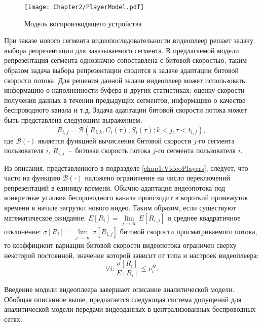 \begin{figure}[htbp]
\begin{center}
\texttt{[image: Chapter2/PlayerModel.pdf]}
\caption{Модель воспроизводящего устройства}
\label{fig:PlayerModel}
\end{center}
\end{figure}

При заказе нового сегмента видеопоследовательности видеоплеер решает задачу выбора репрезентации для заказываемого сегмента. В предлагаемой модели репрезентация сегмента однозначно сопоставлена с битовой скоростью, таким образом задача выбора репрезентации сводится к задаче адаптации битовой скорости потока. Для решения данной задачи видеоплеер может использовать информацию о наполненности буфера и других статистиках: оценку скорости получения данных в течении предыдущих сегментов, информацию о качестве беспроводного канала и т.д. Задача адаптации битовой скорости потока может быть представлена следующим выражением:
\begin{equation}
\nonumber
R_{i,j} = \mathcal{B}\left(R_{i,k}, C_i(\tau), S_i(\tau); k < j, \tau<t_{i,j} \right),
\end{equation}
где $\mathcal{B}\left(\cdot\right)$ является функцией вычисления битовой скорости $j$-го сегмента пользователя $i$, $R_{i,j}$~--~битовая скорость потока $j$-го сегмента пользователя $i$.

Из описания, представленного в подразделе \ref{chap1:VideoPlayers}, следует, что часто на функцию $\mathcal{B}\left(\cdot\right)$ наложено ограничение на число переключений репрезентаций в единицу времени. Обычно адаптация видеопотока под конкретные условия беспроводного канала происходит в короткий промежуток времени в начале загрузки нового видео. Таким образом, если существуют математическое ожидание: $E[R_i] = \lim\limits_{j \rightarrow \infty}E[R_{i,j}]$ и среднее квадратичное отклонение: $\sigma\left[R_{i}\right] = \lim\limits_{j \rightarrow \infty}\sigma\left[R_{i,j}\right] $ битовой скорости просматриваемого потока, то коэффициент вариации битовой скорости видеопотока ограничен сверху некоторой постоянной, значение которой зависит от типа и настроек видеоплеера:
\begin{equation}
\forall i: \frac{ \sigma\left[R_{i}\right] }{ E\left[R_{i}\right]} \leq \nu^R_i.
\label{eq:SwitchRatio}
\end{equation}

Введение модели видеоплеера завершает описание аналитической модели. Обобщая описанное выше, предлагается следующая система допущений для аналитической модели передачи видеоданных в централизованных беспроводных сетях.

